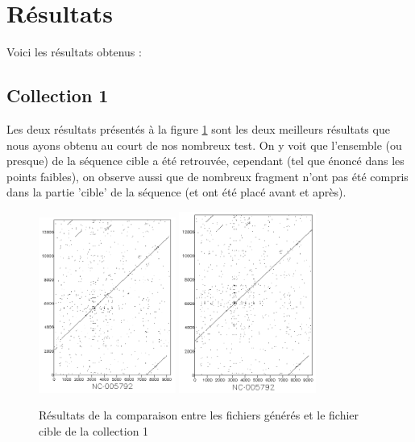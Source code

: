 \documentclass[12pt,a4paper,final]{article}
\begin{document}
\newpage
\section{Résultats}
Voici les résultats obtenus : 

\subsection{Collection 1}
Les deux résultats présentés à la figure \ref{coll1} sont les deux meilleurs résultats que nous ayons obtenu au court de nos nombreux test. On y voit que l'ensemble (ou presque) de la séquence cible a été retrouvée, cependant (tel que énoncé dans les points faibles), on observe aussi que de nombreux fragment n'ont pas été compris dans la partie 'cible' de la séquence (et ont été placé avant et après).

\begin{figure}[!ht]
	\centering
	\includegraphics[width=0.4\textwidth]{images/collection1/collection1_2.png}
	\includegraphics[width=0.4\textwidth]{images/collection1/collection1_16.png}
	\caption{\label{coll1}Résultats de la comparaison entre les fichiers générés et le fichier cible de la collection 1}
\end{figure}
\end{document}
